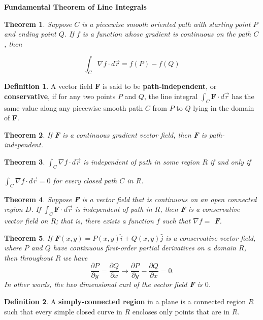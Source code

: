\documentclass[12pt, a4paper]{article}
\theoremstyle{plain}
\newtheorem{theorem}{Theorem}[section]
\theoremstyle{definition}
\newtheorem{definition}{Definition}[section]
\theoremstyle{remark}
\begin{document}
\textbf{Fundamental Theorem of Line Integrals}

\begin{theorem}
Suppose $C$ is a piecewise smooth oriented path with starting point $P$ and ending point $Q$. If $f$ is a function whose gradient is continuous on the path $C$, then 

$$ \int_C \nabla f \cdot d \vec{r} = f(P) - f(Q)  $$
\end{theorem}

\begin{definition}
A vector field \textbf{F} is said to be \textbf{path-independent}, or \textbf{conservative}, if for any two points $P$ and $Q$, the line integral $\int_C \textbf{F} \cdot d \vec{r}$ has the same value along any piecewise smooth path $C$ from $P$ to $Q$ lying in the domain of \textbf{F}.
\end{definition}

\begin{theorem}
If \textbf{F} is a continuous gradient vector field, then \textbf{F} is path-independent.
\end{theorem}

\begin{theorem}
$\int_C \nabla f \cdot d \vec{r}$ is independent of path in some region $R$ if and only if

 $\int_C \nabla f \cdot d \vec{r} = 0$ for every closed path $C$ in $R$.
\end{theorem}

\begin{theorem}
Suppose \textbf{F} is a vector field that is continuous on an open connected region $D$. If $\int_C \textbf{F} \cdot d \vec{r}$ is independent of path in $R$, then \textbf{F} is a conservative vector field on $R$; that is, there exists a function $f$ such that $\nabla f =$ \textbf{F}.
\end{theorem}

\begin{theorem}
If \textbf{F}$(x, y) = P(x, y) \hat{i}+ Q(x, y) \hat{j}$ is a conservative vector field, where $P$ and $Q$ have continuous first-order partial derivatives on a domain $R$, then throughout $R$ we have 
$$ \frac{\partial P}{\partial y} = \frac{\partial Q}{\partial x} \rightarrow \frac{\partial P}{\partial y} - \frac{\partial Q}{\partial x} = 0. $$
In other words, the two dimensional curl of the vector field \textbf{F}  is $0$.
\end{theorem}

\begin{definition}
A \textbf{simply-connected region} in a plane is a connected region $R$ such that every simple closed curve in $R$ encloses only points that are in $R$.
\end{definition}
\end{document}
